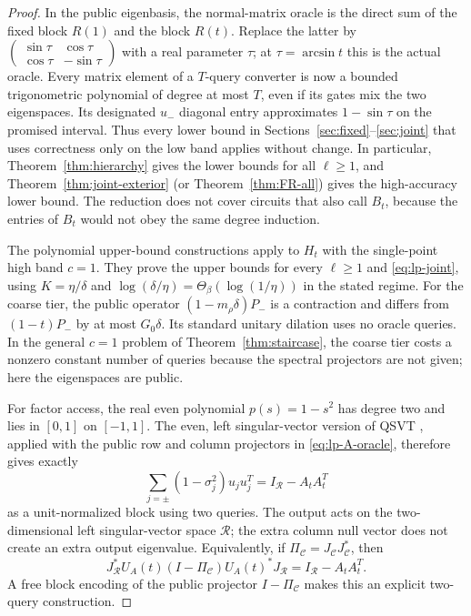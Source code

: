 \begin{proof}
In the public eigenbasis, the normal-matrix oracle is the direct sum of the fixed block $R(1)$ and the block $R(t)$. Replace the latter by
$\left(\begin{smallmatrix}\sin\tau&\cos\tau\\\cos\tau&-\sin\tau\end{smallmatrix}\right)$ with a real parameter $\tau$; at $\tau=\arcsin t$ this is the actual oracle. Every matrix element of a $T$-query converter is now a bounded trigonometric polynomial of degree at most $T$, even if its gates mix the two eigenspaces. Its designated $u_-$ diagonal entry approximates $1-\sin\tau$ on the promised interval. Thus every lower bound in Sections~\ref{sec:fixed}--\ref{sec:joint} that uses correctness only on the low band applies without change. In particular, Theorem~\ref{thm:hierarchy} gives the lower bounds for all $\ell\geq1$, and Theorem~\ref{thm:joint-exterior} (or Theorem~\ref{thm:FR-all}) gives the high-accuracy lower bound. The reduction does not cover circuits that also call $B_t$, because the entries of $B_t$ would not obey the same degree induction.

The polynomial upper-bound constructions apply to $H_t$ with the single-point high band $c=1$. They prove the upper bounds for every $\ell\geq1$ and \eqref{eq:lp-joint}, using $K=\eta/\delta$ and
$\log(\delta/\eta)=\Theta_\beta(\log(1/\eta))$ in the stated regime. For the coarse tier, the public operator
$(1-m_\rho\delta)P_-$ is a contraction and differs from $(1-t)P_-$ by at most $G_0\delta$. Its standard unitary dilation uses no oracle queries. In the general $c=1$ problem of Theorem~\ref{thm:staircase}, the coarse tier costs a nonzero constant number of queries because the spectral projectors are not given; here the eigenspaces are public.

For factor access, the real even polynomial $p(s)=1-s^2$ has degree two and lies in $[0,1]$ on $[-1,1]$. The even, left singular-vector version of QSVT \cite[Corollary 18, extended version]{gilyen2019}, applied with the public row and column projectors in \eqref{eq:lp-A-oracle}, therefore gives exactly
\[
 \sum_{j=\pm}(1-\sigma_j^2)u_ju_j^T
 =I_{\mathcal R}-A_tA_t^T
\]
as a unit-normalized block using two queries. The output acts on the two-dimensional left singular-vector space $\mathcal R$; the extra column null vector does not create an extra output eigenvalue. Equivalently, if $\Pi_{\mathcal C}=J_{\mathcal C}J_{\mathcal C}^*$, then
\[
 J_{\mathcal R}^*U_A(t)(I-\Pi_{\mathcal C})U_A(t)^*J_{\mathcal R}
 =I_{\mathcal R}-A_tA_t^T.
\]
A free block encoding of the public projector $I-\Pi_{\mathcal C}$ makes this an explicit two-query construction.
\end{proof}
